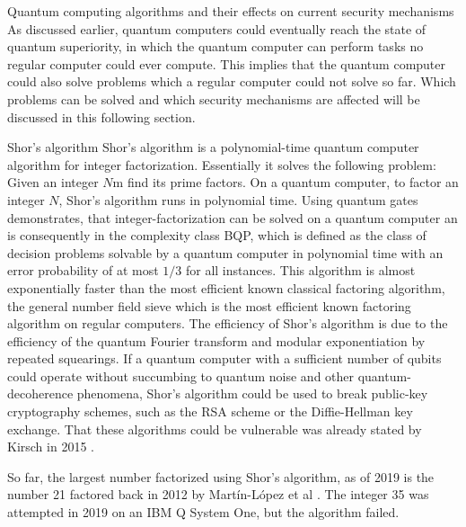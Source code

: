 \documentclass[aps,preprintnumbers,twocolumn]{revtex4}
\begin{document}
\begin{section}{Quantum computing algorithms and their effects on current security mechanisms}
As discussed earlier, quantum computers could eventually reach the state of quantum superiority, 
in which the quantum computer can perform tasks no regular computer could ever compute.
This implies that the quantum computer could also solve problems which a regular computer could not solve so far.
Which problems can be solved and which security mechanisms are affected will be discussed in this following section. 

\begin{subsection}{Shor's algorithm}
Shor's algorithm is a polynomial-time quantum computer algorithm for integer factorization.
Essentially it solves the following problem: 
Given an integer $N$m find its prime factors. 
On a quantum computer, to factor an integer $N$, 
Shor's algorithm runs in polynomial time. 
Using quantum gates demonstrates, 
that integer-factorization can be solved on a quantum computer an is consequently in the complexity class BQP, 
which is defined as the class of decision problems solvable by a quantum computer in polynomial time with an error probability of at most $1/3$ for all instances. 
This algorithm is almost exponentially faster than the most efficient known classical factoring algorithm, the general number field sieve which is the most efficient known factoring algorithm on regular computers. 
The efficiency of Shor's algorithm is due to the efficiency of the quantum Fourier transform and modular exponentiation by repeated squearings. 
If a quantum computer with a sufficient number of qubits could operate without succumbing to quantum noise and other quantum-decoherence phenomena, 
Shor's algorithm could be used to break public-key cryptography schemes, 
such as the RSA scheme or the Diffie-Hellman key exchange. That these algorithms could be vulnerable was already stated by Kirsch in 2015
\cite{Kirsch2015QuantumCT}.

So far, the largest number factorized using Shor's algorithm, 
as of 2019 is the number 21 factored back in 2012 by Martín-López et al \cite{article}. 
The integer 35 was attempted in 2019 on an IBM Q System One, 
but the algorithm failed. 

\end{subsection}


\end{section}
\end{document}
